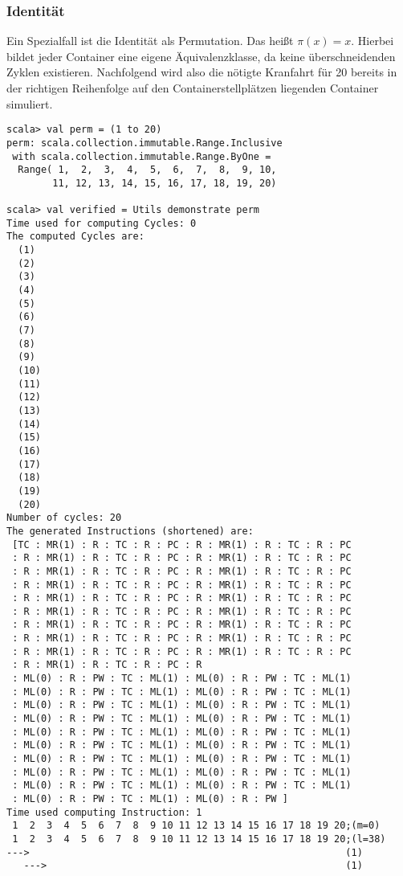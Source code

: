 \subsubsection*{Identität}
Ein Spezialfall ist die Identität als Permutation. Das heißt $\pi(x) = x$.
Hierbei bildet jeder Container eine eigene Äquivalenzklasse, da keine überschneidenden Zyklen existieren.
Nachfolgend wird also die nötigte Kranfahrt für 20 bereits in der richtigen Reihenfolge auf den Containerstellplätzen liegenden Container simuliert.
\begin{lstlisting}
scala> val perm = (1 to 20)                   
perm: scala.collection.immutable.Range.Inclusive
 with scala.collection.immutable.Range.ByOne =
  Range( 1,  2,  3,  4,  5,  6,  7,  8,  9, 10,
        11, 12, 13, 14, 15, 16, 17, 18, 19, 20)

scala> val verified = Utils demonstrate perm
Time used for computing Cycles: 0
The computed Cycles are: 
  (1)
  (2)
  (3)
  (4)
  (5)
  (6)
  (7)
  (8)
  (9)
  (10)
  (11)
  (12)
  (13)
  (14)
  (15)
  (16)
  (17)
  (18)
  (19)
  (20)
Number of cycles: 20
The generated Instructions (shortened) are: 
 [TC : MR(1) : R : TC : R : PC : R : MR(1) : R : TC : R : PC
 : R : MR(1) : R : TC : R : PC : R : MR(1) : R : TC : R : PC
 : R : MR(1) : R : TC : R : PC : R : MR(1) : R : TC : R : PC
 : R : MR(1) : R : TC : R : PC : R : MR(1) : R : TC : R : PC
 : R : MR(1) : R : TC : R : PC : R : MR(1) : R : TC : R : PC
 : R : MR(1) : R : TC : R : PC : R : MR(1) : R : TC : R : PC
 : R : MR(1) : R : TC : R : PC : R : MR(1) : R : TC : R : PC
 : R : MR(1) : R : TC : R : PC : R : MR(1) : R : TC : R : PC
 : R : MR(1) : R : TC : R : PC : R : MR(1) : R : TC : R : PC
 : R : MR(1) : R : TC : R : PC : R
 : ML(0) : R : PW : TC : ML(1) : ML(0) : R : PW : TC : ML(1) 
 : ML(0) : R : PW : TC : ML(1) : ML(0) : R : PW : TC : ML(1)
 : ML(0) : R : PW : TC : ML(1) : ML(0) : R : PW : TC : ML(1)
 : ML(0) : R : PW : TC : ML(1) : ML(0) : R : PW : TC : ML(1)
 : ML(0) : R : PW : TC : ML(1) : ML(0) : R : PW : TC : ML(1)
 : ML(0) : R : PW : TC : ML(1) : ML(0) : R : PW : TC : ML(1)
 : ML(0) : R : PW : TC : ML(1) : ML(0) : R : PW : TC : ML(1)
 : ML(0) : R : PW : TC : ML(1) : ML(0) : R : PW : TC : ML(1)
 : ML(0) : R : PW : TC : ML(1) : ML(0) : R : PW : TC : ML(1)
 : ML(0) : R : PW : TC : ML(1) : ML(0) : R : PW ] 
Time used computing Instruction: 1
 1  2  3  4  5  6  7  8  9 10 11 12 13 14 15 16 17 18 19 20;(m=0)
 1  2  3  4  5  6  7  8  9 10 11 12 13 14 15 16 17 18 19 20;(l=38)
--->                                                       (1)
   --->                                                    (1)

\end{lstlisting}
